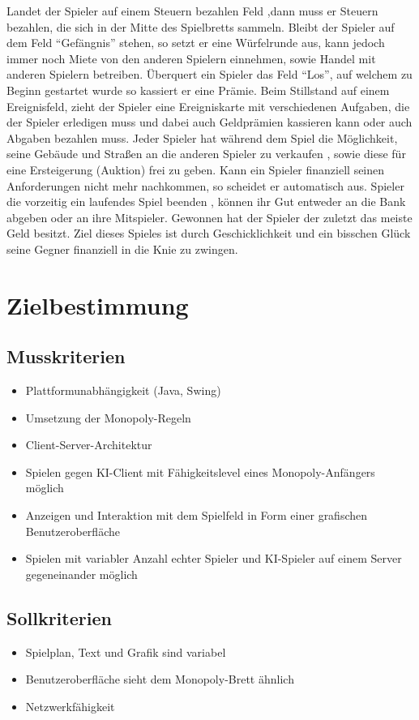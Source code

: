 \documentclass[a4paper,10pt]{article}
\begin{document}
Landet der Spieler auf einem \glqq Steuern bezahlen Feld \grqq ,dann muss er Steuern bezahlen, die sich in der Mitte des Spielbretts sammeln. Bleibt der Spieler auf dem  Feld ``Gefängnis'' stehen, so setzt er eine Würfelrunde aus, kann jedoch immer noch Miete von den anderen Spielern einnehmen, sowie Handel mit anderen Spielern betreiben.  Überquert ein Spieler  das Feld ``Los'', auf welchem zu Beginn gestartet wurde so kassiert er eine Prämie. Beim Stillstand auf einem Ereignisfeld, zieht der Spieler eine Ereigniskarte mit verschiedenen Aufgaben, die der Spieler erledigen muss und dabei auch Geldprämien kassieren kann oder auch Abgaben bezahlen muss.  Jeder Spieler hat während dem Spiel die Möglichkeit, seine Gebäude und Straßen an die anderen Spieler zu verkaufen , sowie diese für eine Ersteigerung (Auktion) frei zu geben. Kann ein Spieler finanziell seinen Anforderungen nicht mehr nachkommen, so scheidet er automatisch aus. Spieler die vorzeitig ein laufendes Spiel beenden , können ihr Gut entweder an die Bank abgeben oder an ihre Mitspieler. Gewonnen hat der Spieler der zuletzt das meiste Geld besitzt. Ziel dieses Spieles ist durch Geschicklichkeit und ein bisschen Glück seine Gegner finanziell in die Knie zu zwingen.
\section{Zielbestimmung}
\subsection{Musskriterien}
\begin{itemize}
\item Plattformunabhängigkeit (Java, Swing)
\item Umsetzung der Monopoly-Regeln
\item Client-Server-Architektur
\item Spielen gegen KI-Client mit Fähigkeitslevel eines Monopoly-Anfängers möglich
\item Anzeigen und Interaktion mit dem Spielfeld in Form einer grafischen Benutzeroberfläche
\item Spielen mit variabler Anzahl echter Spieler und KI-Spieler auf einem Server gegeneinander möglich
\end{itemize}
\subsection{Sollkriterien}
\begin{itemize}
\item Spielplan, Text und Grafik sind variabel
\item Benutzeroberfläche sieht dem Monopoly-Brett ähnlich
\item Netzwerkfähigkeit
\end{itemize}
\end{document}
